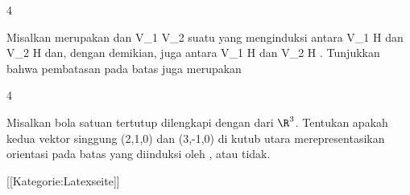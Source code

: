 {4}
{

Misalkan
merupakan
dan
\maabbdisp {\varphi} {V_1 } { V_2
} {}
suatu
yang menginduksi
antara
\mathkor {} {V_1 \cap H} {dan} {V_2 \cap H} {}
dan, dengan demikian, juga antara
\mathkor {} {V_1 \cap \partial H} {dan} {V_2 \cap \partial H} {}
 {} {.}
Tunjukkan bahwa pembatasan pada batas juga merupakan

}
{} {}

{4}
{

Misalkan bola satuan tertutup
 dilengkapi dengan
 dari $\R^3$. Tentukan apakah kedua vektor singgung
\mathkor {} {(2,1,0)} {dan} {(3,-1,0)} {}
di kutub utara
 merepresentasikan orientasi pada batas yang diinduksi oleh
 {} {,}
atau tidak.

}
{} {}

 [[Kategorie:Latexseite]]
